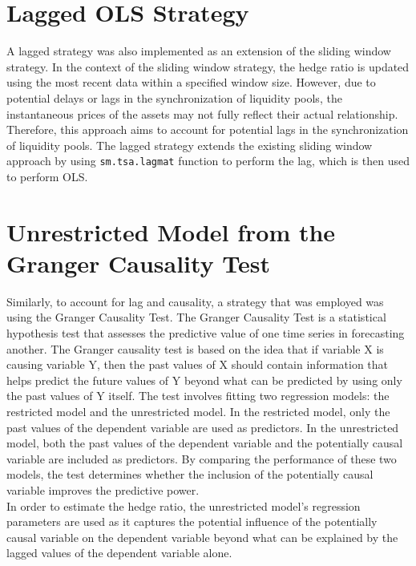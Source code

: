 \section{Lagged OLS Strategy}
A lagged strategy was also implemented as an extension of the sliding window strategy. In the context of the sliding window strategy, the hedge ratio is updated using the most recent data within a specified window size. However, due to potential delays or lags in the synchronization of liquidity pools, the instantaneous prices of the assets may not fully reflect their actual relationship. Therefore, this approach aims to account for potential lags in the synchronization of liquidity pools. The lagged strategy extends the existing sliding window approach by using \texttt{sm.tsa.lagmat} function to perform the lag, which is then used to perform OLS.

\section{Unrestricted Model from the Granger Causality Test}
Similarly, to account for lag and causality, a strategy that was employed was using the Granger Causality Test. The Granger Causality Test is a statistical hypothesis test that assesses the predictive value of one time series in forecasting another. The Granger causality test is based on the idea that if variable X is causing variable Y, then the past values of X should contain information that helps predict the future values of Y beyond what can be predicted by using only the past values of Y itself. The test involves fitting two regression models: the restricted model and the unrestricted model. In the restricted model, only the past values of the dependent variable are used as predictors. In the unrestricted model, both the past values of the dependent variable and the potentially causal variable are included as predictors. By comparing the performance of these two models, the test determines whether the inclusion of the potentially causal variable improves the predictive power.
\\[3mm]
In order to estimate the hedge ratio, the unrestricted model's regression parameters are used as it captures the potential influence of the potentially causal variable on the dependent variable beyond what can be explained by the lagged values of the dependent variable alone.

